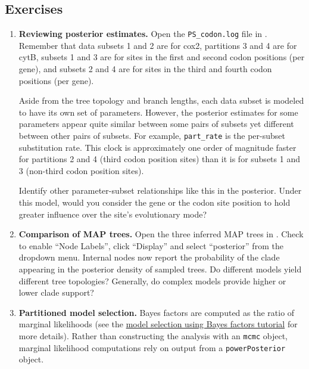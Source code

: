 
\subsection{Exercises}
\begin{enumerate}

\item {\bf Reviewing posterior estimates.} Open the {\tt PS\_codon.log} file in \Tracer. Remember that data subsets 1 and 2 are for cox2, partitions 3 and 4 are for cytB, subsets 1 and 3 are for sites in the first and second codon positions (per gene), and subsets 2 and 4 are for sites in the third and fourth codon positions (per gene).

Aside from the tree topology and branch lengths, each data subset is modeled to have its own set of parameters.
However, the posterior estimates for some parameters appear quite similar between some pairs of subsets yet different between other pairs of subsets.
For example, {\tt part\_rate} is the per-subset substitution rate.
This clock is approximately one order of magnitude faster for partitions 2 and 4 (third codon position sites) than it is for subsets 1 and 3 (non-third codon position sites).

Identify other parameter-subset relationships like this in the posterior.
Under this model, would you consider the gene or the codon site position to hold greater influence over the site's evolutionary mode?

\item {\bf Comparison of MAP trees.} Open the three inferred MAP trees in \FigTree.
Check to enable ``Node Labels'', click ``Display'' and select ``posterior'' from the dropdown menu.
Internal nodes now report the probability of the clade appearing in the posterior density of sampled trees.
Do different models yield different tree topologies?
Generally, do complex models provide higher or lower clade support?

\item {\bf Partitioned model selection.}
Bayes factors are computed as the ratio of marginal likelihoods (see the \href{https://github.com/revbayes/revbayes_tutorial/raw/master/tutorial_TeX/RB_BayesFactor_Tutorial/RB_BayesFactor_Tutorial.pdf}{model selection using Bayes factors tutorial} for more details).
Rather than constructing the analysis with an {\tt mcmc} object, marginal likelihood computations rely on output from a {\tt powerPosterior} object.


\end{enumerate}

